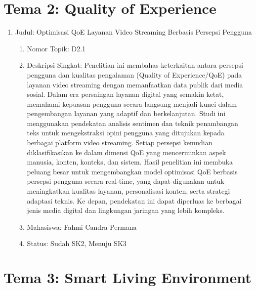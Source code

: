 \documentclass[
  letterpaper,
  DIV=11,
  numbers=noendperiod]{scrreprt}
\begin{document}
\section{Tema 2: Quality of
Experience}\label{tema-2-quality-of-experience}

\begin{enumerate}
\def\labelenumi{\arabic{enumi}.}
\item
  Judul: Optimisasi QoE Layanan Video Streaming Berbasis Persepsi
  Pengguna

  \begin{enumerate}
  \def\labelenumii{\arabic{enumii}.}
  \item
    Nomor Topik: D2.1
  \item
    Deskripsi Singkat: Penelitian ini membahas keterkaitan antara
    persepsi pengguna dan kualitas pengalaman (Quality of
    Experience/QoE) pada layanan video streaming dengan memanfaatkan
    data publik dari media sosial. Dalam era persaingan layanan digital
    yang semakin ketat, memahami kepuasan pengguna secara langsung
    menjadi kunci dalam pengembangan layanan yang adaptif dan
    berkelanjutan. Studi ini menggunakan pendekatan analisis sentimen
    dan teknik penambangan teks untuk mengekstraksi opini pengguna yang
    ditujukan kepada berbagai platform video streaming. Setiap persepsi
    kemudian diklasifikasikan ke dalam dimensi QoE yang mencerminkan
    aspek manusia, konten, konteks, dan sistem. Hasil penelitian ini
    membuka peluang besar untuk mengembangkan model optimisasi QoE
    berbasis persepsi pengguna secara real-time, yang dapat digunakan
    untuk meningkatkan kualitas layanan, personalisasi konten, serta
    strategi adaptasi teknis. Ke depan, pendekatan ini dapat diperluas
    ke berbagai jenis media digital dan lingkungan jaringan yang lebih
    kompleks.
  \item
    Mahasiswa: Fahmi Candra Permana
  \item
    Status: Sudah SK2, Menuju SK3
  \end{enumerate}
\end{enumerate}

\section{Tema 3: Smart Living
Environment}\label{tema-3-smart-living-environment}
\end{document}
